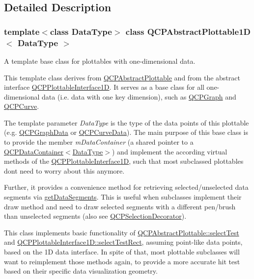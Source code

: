 \subsection{Detailed Description}
\subsubsection*{template$<$class Data\+Type$>$\newline
class Q\+C\+P\+Abstract\+Plottable1\+D$<$ Data\+Type $>$}

A template base class for plottables with one-\/dimensional data. 

This template class derives from \hyperlink{class_q_c_p_abstract_plottable}{Q\+C\+P\+Abstract\+Plottable} and from the abstract interface \hyperlink{class_q_c_p_plottable_interface1_d}{Q\+C\+P\+Plottable\+Interface1D}. It serves as a base class for all one-\/dimensional data (i.\+e. data with one key dimension), such as \hyperlink{class_q_c_p_graph}{Q\+C\+P\+Graph} and \hyperlink{class_q_c_p_curve}{Q\+C\+P\+Curve}.

The template parameter {\itshape Data\+Type} is the type of the data points of this plottable (e.\+g. \hyperlink{class_q_c_p_graph_data}{Q\+C\+P\+Graph\+Data} or \hyperlink{class_q_c_p_curve_data}{Q\+C\+P\+Curve\+Data}). The main purpose of this base class is to provide the member {\itshape m\+Data\+Container} (a shared pointer to a \hyperlink{class_q_c_p_data_container}{Q\+C\+P\+Data\+Container$<$Data\+Type$>$}) and implement the according virtual methods of the \hyperlink{class_q_c_p_plottable_interface1_d}{Q\+C\+P\+Plottable\+Interface1D}, such that most subclassed plottables don\textquotesingle{}t need to worry about this anymore.

Further, it provides a convenience method for retrieving selected/unselected data segments via \hyperlink{class_q_c_p_abstract_plottable1_d_ae890e62ce403c54f575c73b9529f1af8}{get\+Data\+Segments}. This is useful when subclasses implement their draw method and need to draw selected segments with a different pen/brush than unselected segments (also see \hyperlink{class_q_c_p_selection_decorator}{Q\+C\+P\+Selection\+Decorator}).

This class implements basic functionality of \hyperlink{class_q_c_p_abstract_plottable_a38efe9641d972992a3d44204bc80ec1d}{Q\+C\+P\+Abstract\+Plottable\+::select\+Test} and \hyperlink{class_q_c_p_plottable_interface1_d_a67093e4ccf490ff5f7750640941ff34c}{Q\+C\+P\+Plottable\+Interface1\+D\+::select\+Test\+Rect}, assuming point-\/like data points, based on the 1D data interface. In spite of that, most plottable subclasses will want to reimplement those methods again, to provide a more accurate hit test based on their specific data visualization geometry. 

